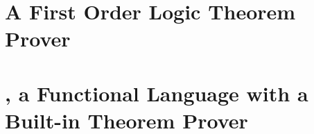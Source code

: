 \section{A First Order Logic Theorem Prover}

\label{example1}

\section{\Funl{}, a Functional Language with a Built-in Theorem Prover}

\label{example2}


